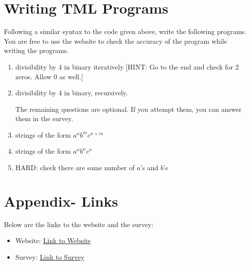 \documentclass[answers]{exam}
\begin{document}
    \newpage

    
    \section{Writing TML Programs}
    
    Following a similar syntax to the code given above, write the following programs. You are free to use the website to check the accuracy of the program while writing the programs.
    \begin{enumerate}
        \item divisibility by 4 in binary iteratively [HINT: Go to the end and check for 2 zeros. Allow 0 as well.]
        \begin{solution}
            \vspace*{520pt}
        \end{solution}
        
        \item divisibility by 4 in binary, recursively.
        \begin{solution}
            \vspace*{570pt}
        \end{solution}
        
        \noindent The remaining questions are optional. If you attempt them, you can answer them in the survey.
        \item strings of the form $a^n b^m c^{n+m}$
        \item strings of the form $a^n b^n c^n$
        \item HARD: check there are same number of $a$'s and $b$'s
    \end{enumerate}

    \section{Appendix- Links}
    Below are the links to the website and the survey:
    \begin{itemize}
        \item Website: \href{https://pete-g00.github.io/Turing-Machine-Language/}{Link to Website}
        \item Survey: \href{https://forms.office.com/e/Ts6nKgxWkU}{Link to Survey}
    \end{itemize}
    
    
    
\end{document}
